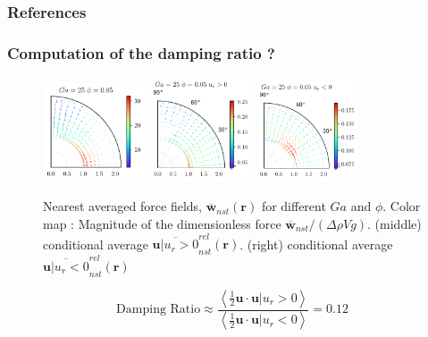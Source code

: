 \documentclass{sintefbeamer}
\newcommand{\avg}[1]{\left<#1\right>}
\newcommand{\nstavg}[1]{\overline{#1}_{nst}}
\newcommand{\nstrelavg}[1]{\overline{#1}_{nst}^{rel}}
\begin{document}
\begin{frame}[t]
  \frametitle{References}
  
\end{frame}

 
\backmatter
\begin{frame}
  \frametitle{Computation of the damping ratio ? }
  \begin{figure}
    \centering
    \includegraphics[width=0.27\textwidth]{image/HOMOGENEOUS/fDrop/U_mu_r_0_1_Ga_25_PHI_0_05.pdf}
    \includegraphics[width=0.27\textwidth]{image/HOMOGENEOUS/fDrop/Upos_mu_r_0_1_Ga_25_PHI_0_05.pdf}
    \includegraphics[width=0.27\textwidth]{image/HOMOGENEOUS/fDrop/Uneg_mu_r_0_1_Ga_25_PHI_0_05.pdf}
    \caption{Nearest averaged force fields, $\nstavg{\textbf{w}}(\textbf{r})$ for different $Ga$ and $\phi$. 
    Color map : Magnitude of the dimensionless force  $\nstavg{\textbf{w}} / (\Delta \rho V g)$.
    (middle) conditional average  $\nstrelavg{\textbf{u}| u_r > 0}(\textbf{r})$. 
    (right) conditional average  $\nstrelavg{\textbf{u}| u_r < 0}(\textbf{r})$ }
  \end{figure}
  \begin{equation}
    \text{Damping Ratio}
    \approx \frac{\avg{\frac{1}{2} \textbf{u} \cdot \textbf{u}| u_r > 0}}
    {\avg{\frac{1}{2}\textbf{u}\cdot \textbf{u}| u_r < 0}}
    = 0.12
  \end{equation}
\end{frame}
\end{document}
